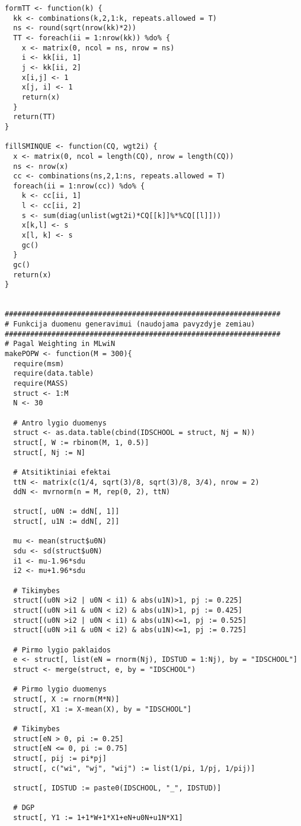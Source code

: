 \documentclass[12pt,a4paper]{article}
\begin{document}
\begin{appendix}
\begin{footnotesize}
\begin{verbatim}
formTT <- function(k) {
  kk <- combinations(k,2,1:k, repeats.allowed = T)
  ns <- round(sqrt(nrow(kk)*2))
  TT <- foreach(ii = 1:nrow(kk)) %do% {
    x <- matrix(0, ncol = ns, nrow = ns)
    i <- kk[ii, 1]
    j <- kk[ii, 2]
    x[i,j] <- 1
    x[j, i] <- 1
    return(x)
  }
  return(TT)
}

fillSMINQUE <- function(CQ, wgt2i) {
  x <- matrix(0, ncol = length(CQ), nrow = length(CQ))
  ns <- nrow(x)
  cc <- combinations(ns,2,1:ns, repeats.allowed = T)
  foreach(ii = 1:nrow(cc)) %do% {
    k <- cc[ii, 1]
    l <- cc[ii, 2]
    s <- sum(diag(unlist(wgt2i)*CQ[[k]]%*%CQ[[l]]))
    x[k,l] <- s
    x[l, k] <- s
    gc()
  }
  gc()
  return(x)
}


#################################################################
# Funkcija duomenu generavimui (naudojama pavyzdyje zemiau)
#################################################################
# Pagal Weighting in MLwiN
makePOPW <- function(M = 300){
  require(msm)
  require(data.table)
  require(MASS)
  struct <- 1:M
  N <- 30
  
  # Antro lygio duomenys
  struct <- as.data.table(cbind(IDSCHOOL = struct, Nj = N))
  struct[, W := rbinom(M, 1, 0.5)]
  struct[, Nj := N]
  
  # Atsitiktiniai efektai 
  ttN <- matrix(c(1/4, sqrt(3)/8, sqrt(3)/8, 3/4), nrow = 2)
  ddN <- mvrnorm(n = M, rep(0, 2), ttN)
  
  struct[, u0N := ddN[, 1]]
  struct[, u1N := ddN[, 2]]
  
  mu <- mean(struct$u0N)
  sdu <- sd(struct$u0N)
  i1 <- mu-1.96*sdu
  i2 <- mu+1.96*sdu
  
  # Tikimybes
  struct[(u0N >i2 | u0N < i1) & abs(u1N)>1, pj := 0.225]
  struct[(u0N >i1 & u0N < i2) & abs(u1N)>1, pj := 0.425]
  struct[(u0N >i2 | u0N < i1) & abs(u1N)<=1, pj := 0.525]
  struct[(u0N >i1 & u0N < i2) & abs(u1N)<=1, pj := 0.725]
  
  # Pirmo lygio paklaidos
  e <- struct[, list(eN = rnorm(Nj), IDSTUD = 1:Nj), by = "IDSCHOOL"]
  struct <- merge(struct, e, by = "IDSCHOOL")
  
  # Pirmo lygio duomenys
  struct[, X := rnorm(M*N)]
  struct[, X1 := X-mean(X), by = "IDSCHOOL"]
  
  # Tikimybes
  struct[eN > 0, pi := 0.25]
  struct[eN <= 0, pi := 0.75]
  struct[, pij := pi*pj]
  struct[, c("wi", "wj", "wij") := list(1/pi, 1/pj, 1/pij)]
  
  struct[, IDSTUD := paste0(IDSCHOOL, "_", IDSTUD)]
  
  # DGP
  struct[, Y1 := 1+1*W+1*X1+eN+u0N+u1N*X1]
  

\end{verbatim}
\end{footnotesize}
\end{appendix}
\end{document}
